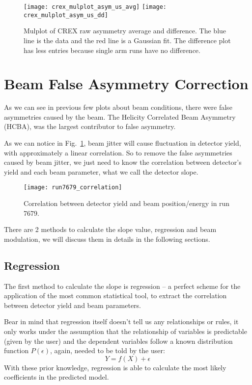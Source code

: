 \begin{figure}[H]
    \centering
    \texttt{[image: crex\_mulplot\_asym\_us\_avg]}
    \texttt{[image: crex\_mulplot\_asym\_us\_dd]}
    \caption{Mulplot of CREX raw asymmetry average and difference. The blue line
    is the data and the red line is a Gaussian fit. 
    The difference plot has less entries because single arm runs have no difference.}
\end{figure}


\section{Beam False Asymmetry Correction}
As we can see in previous few plots about beam conditions, there were false
asymmetries caused by the beam. The Helicity Correlated Beam Asymmetry (HCBA), 
was the largest contributor to false asymmetry.

As we can notice in Fig.~\ref{fig:correlation}, beam jitter will cause 
fluctuation in detector yield, with approximately a linear correlation.
So to remove the false asymmetries caused by beam jitter, we just need to
know the correlation between detector's yield and each beam parameter, what
we call the detector slope. 

\begin{figure}[H]
    \centering
    \texttt{[image: run7679\_correlation]}
    \caption{Correlation between detector yield and beam position/energy in run 7679.}
    \label{fig:correlation}
\end{figure}

There are 2 methods to calculate the slope value, regression and beam modulation,
we will discuss them in details in the following sections.

\subsection{Regression}

The first method to calculate the slope is regression -- a perfect scheme for
the application of the most common statistical tool, to extract the correlation
between detector yield and beam parameters.

Bear in mind that regression itself doesn't tell us any relationships or rules, 
it only works under
the assumption that the relationship of variables is predictable (given by the user) 
and the dependent variables follow a known distribution function $P(\epsilon)$, 
again, needed to be told by the user:
$$ Y = f(X) + \epsilon $$
With these prior knowledge, regression is able to calculate the most likely 
coefficients in the predicted model.

